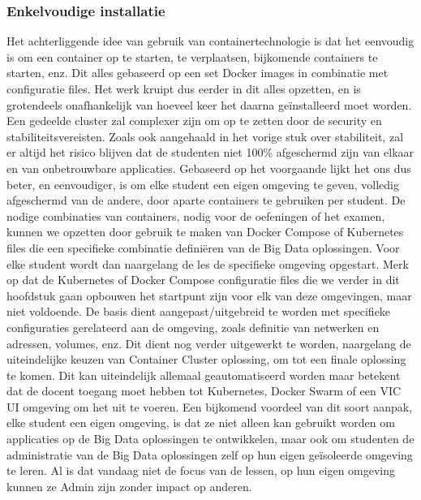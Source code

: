 \subsubsection{Enkelvoudige installatie}
Het achterliggende idee van gebruik van containertechnologie is dat het eenvoudig is om een container op te starten, te verplaatsen, bijkomende containers te starten, enz. Dit alles gebaseerd op een set Docker images in combinatie met configuratie files.
\newline
Het werk kruipt dus eerder in dit alles opzetten, en is grotendeels onafhankelijk van hoeveel keer het daarna geïnstalleerd moet worden.
Een gedeelde cluster zal complexer zijn om op te zetten door de security en stabiliteitsvereisten.
\newline
Zoals ook aangehaald in het vorige stuk over stabiliteit, zal er altijd het risico blijven dat de studenten niet 100\% afgeschermd zijn van elkaar en van onbetrouwbare applicaties.
\newline
Gebaseerd op het voorgaande lijkt het ons dus beter, en eenvoudiger, is om elke student een eigen omgeving te geven, volledig afgeschermd van de andere, door aparte containers te gebruiken per student.
\newline
De nodige combinaties van containers, nodig voor de oefeningen of het examen, kunnen we opzetten door gebruik te maken van Docker Compose of Kubernetes files die een specifieke combinatie definiëren van de Big Data oplossingen. Voor elke student wordt dan naargelang de les de specifieke omgeving opgestart.
\newline
Merk op dat de Kubernetes of Docker Compose configuratie files die we verder in dit hoofdstuk gaan opbouwen het startpunt zijn voor elk van deze omgevingen, maar niet voldoende. De basis dient aangepast/uitgebreid te worden met specifieke configuraties gerelateerd aan de omgeving, zoals definitie van netwerken en adressen, volumes, enz. Dit dient nog verder uitgewerkt te worden, naargelang de uiteindelijke keuzen van Container Cluster oplossing, om tot een finale oplossing te komen.
\newline
Dit kan uiteindelijk allemaal geautomatiseerd worden maar betekent dat de docent toegang moet hebben tot Kubernetes, Docker Swarm of een VIC UI omgeving om het uit te voeren.
\newline
Een bijkomend voordeel van dit soort aanpak, elke student een eigen omgeving, is dat ze niet alleen kan gebruikt worden om applicaties op de Big Data oplossingen te ontwikkelen, maar ook om studenten de administratie van de Big Data oplossingen zelf op hun eigen geïsoleerde omgeving te leren. Al is dat vandaag niet de focus van de lessen, op hun eigen omgeving kunnen ze Admin zijn zonder impact op anderen.
\newline
\newline



